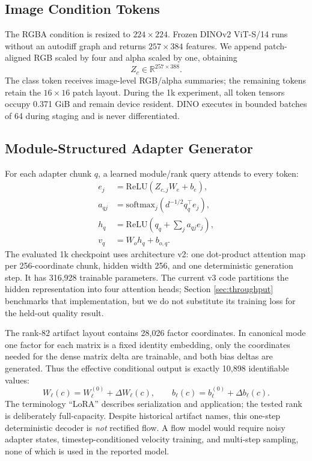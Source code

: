 \documentclass[sigconf,nonacm]{acmart}
\begin{document}
\subsection{Image Condition Tokens}

The RGBA condition is resized to $224\times224$. Frozen DINOv2 ViT-S/14 runs
without an autodiff graph and returns $257\times384$ features. We append
patch-aligned RGB scaled by four and alpha scaled by one, obtaining
\begin{equation}
Z_c\in\mathbb{R}^{257\times388}.
\end{equation}
The class token receives image-level RGB/alpha summaries; the remaining tokens
retain the $16\times16$ patch layout. During the 1k experiment, all token
tensors occupy 0.371 GiB and remain device resident. DINO executes in bounded
batches of 64 during staging and is never differentiated.

\subsection{Module-Structured Adapter Generator}

For each adapter chunk $q$, a learned module/rank query attends to every token:
\begin{align}
e_j &= \mathrm{ReLU}(Z_{c,j}W_e+b_e),\\
a_{qj} &= \mathrm{softmax}_j\!\left(d^{-1/2}q_q^\top e_j\right),\\
h_q &= \mathrm{ReLU}\!\left(q_q+\sum_j a_{qj}e_j\right),\\
v_q &= W_o h_q+b_{o,q}.
\label{eq:adapter-generator}
\end{align}
The evaluated 1k checkpoint uses architecture v2: one dot-product attention
map per 256-coordinate chunk, hidden width 256, and one deterministic
generation step. It has 316,928 trainable parameters. The current v3 code
partitions the hidden representation into four attention heads; Section
\ref{sec:throughput} benchmarks that implementation, but we do not substitute
its training loss for the held-out quality result.

The rank-82 artifact layout contains 28,026 factor coordinates. In canonical
mode one factor for each matrix is a fixed identity embedding, only the
coordinates needed for the dense matrix delta are trainable, and both bias
deltas are generated. Thus the effective conditional output is exactly 10,898
identifiable values:
\begin{equation}
W_\ell(c)=W_\ell^{(0)}+\Delta W_\ell(c),\qquad
b_\ell(c)=b_\ell^{(0)}+\Delta b_\ell(c).
\end{equation}
The terminology ``LoRA'' describes serialization and application; the tested
rank is deliberately full-capacity. Despite historical artifact names, this
one-step deterministic decoder is \emph{not} rectified flow. A flow model
would require noisy adapter states, timestep-conditioned velocity training,
and multi-step sampling, none of which is used in the reported model.
\end{document}
